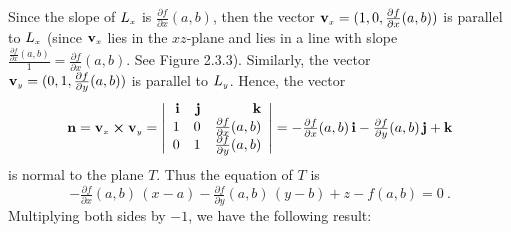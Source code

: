 \piccaption[]{}
\par\noindent Since the slope of
$L_{\scriptscriptstyle x}$ is $\frac{\partial f}{\partial x}(a,b)$, then the vector
$\mathbf{v}_{\scriptscriptstyle x}=(1,0,\frac{\partial f}{\partial x}(a,b))$ is parallel to $L_{\scriptscriptstyle x}$ (since
$\mathbf{v}_{\scriptscriptstyle x}$ lies in the
$xz$-plane and lies in a line with slope $\frac{\frac{\partial f}{\partial x}(a,b)}{1}=
\frac{\partial f}{\partial x}(a,b)$. See Figure 2.3.3).
Similarly, the vector\\$\mathbf{v}_{\scriptscriptstyle y}=(0,1,\frac{\partial f}{\partial y}(a,b))$ is parallel to $L_{\scriptscriptstyle y}$.
Hence, the vector
\begin{displaymath}
 \mathbf{n} = \mathbf{v}_{\scriptscriptstyle x} \bm{\times} \mathbf{v}_{\scriptscriptstyle y} =
  \left|
  \begin{array}{rrr}
   \mathbf{i} & \mathbf{j} & \mathbf{k}\\
   1 & 0 & \tfrac{\partial f}{\partial x}(a,b)\\
   0 & 1 & \tfrac{\partial f}{\partial y}(a,b)
  \end{array}\right|
  = -\tfrac{\partial f}{\partial x}(a,b)\,\mathbf{i} - \tfrac{\partial f}{\partial y}(a,b)\,\mathbf{j} + \mathbf{k}
\end{displaymath}
is normal to the plane $T$. Thus the equation of $T$ is
\begin{equation}
 -\tfrac{\partial f}{\partial x}(a,b)\,(x-a) - \tfrac{\partial f}{\partial y}(a,b)\,(y-b)+z-f(a,b)=0 ~.
\end{equation}
Multiplying both sides by $-1$, we have the following result:\smallskip
{}


